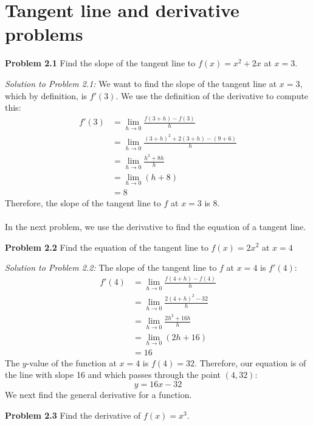 \documentclass[11pt]{scrartcl}
\begin{document}
\section{Tangent line and derivative problems}
\begin{tcolorbox}
[colback=purple!5!white,colframe=purple!75!black]
\textbf{Problem 2.1} Find the slope of the tangent line to $f(x)=x^2+2x$ at $x=3$. 
\end{tcolorbox}
\noindent
\textit{Solution to Problem 2.1:} We want to find the slope of the tangent line at $x=3$, which by definition, is $f'(3)$. We use the definition of the derivative to compute this:
\begin{align*}
    f'(3) &= \lim_{h \to 0} \frac{f(3+h)-f(3)}{h} \\
          &= \lim_{h \to 0} \frac{(3+h)^2+2(3+h)-(9+6)}{h}\\
          &= \lim_{h \to 0} \frac{h^2+8h}{h}\\
          &= \lim_{h \to 0} (h+8)\\
          &= 8
\end{align*}
Therefore, the slope of the tangent line to $f$ at $x=3$ is 8. \\
\\
\noindent 
In the next problem, we use the derivative to find the equation of a tangent line. 
\begin{tcolorbox}
[colback=purple!5!white,colframe=purple!75!black]
\noindent
\textbf{Problem 2.2} Find the equation of the tangent line to $f(x)=2x^2$ at $x=4$
\end{tcolorbox}
\noindent
\textit{Solution to Problem 2.2:} The slope of the tangent line to $f$ at $x=4$ is $f'(4)$:
\begin{align*}
    f'(4) &=\lim_{h \to 0} \frac{f(4+h)-f(4)}{h}\\
          &=\lim_{h \to 0} \frac{2(4+h)^2-32}{h}\\
          &=\lim_{h \to 0} \frac{2h^2+16h}{h}\\
          &=\lim_{h \to 0} (2h+16)\\
          &= 16
\end{align*}
The $y$-value of the function at $x=4$ is $f(4)=32$. Therefore, our equation is of the line with slope 16 and which passes through the point $(4,32)$: 
$$y=16x-32$$
\noindent 
We next find the general derivative for a function. 
\begin{tcolorbox}
[colback=purple!5!white,colframe=purple!75!black]
\textbf{Problem 2.3} Find the derivative of $f(x)=x^3$.
\end{tcolorbox}
\end{document}
